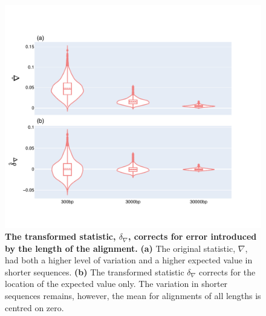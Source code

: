 \begin{figure}[htbp]
\centering
\includegraphics[width=\textwidth]{figures/plots/synthetic/d-conv-vs-conv/High JSD, High Entropy.pdf}
\caption{\textbf{The transformed statistic, $\delta_\nabla$, corrects for error introduced by the length of the alignment.} \textbf{(a)} The original statistic, $\nabla$, had both a higher level of variation and a higher expected value in shorter sequences. \textbf{(b)} The transformed statistic $\delta_\nabla$ corrects for the location of the expected value only. The variation in shorter sequences remains, however, the mean for alignments of all lengths is centred on zero.}
\label{fig:synthetic/d-conv-vs-conv/HighJSDHighEntropy}
\end{figure}